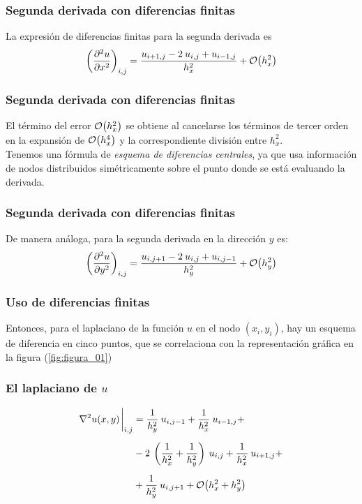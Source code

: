 \begin{frame}
\frametitle{Segunda derivada con diferencias finitas}
La expresión de diferencias finitas para la segunda derivada es
\begin{align}
\left( \pdv[2]{u}{x} \right)_{i,j} = \dfrac{u_{i+1, j} - 2 \: u_{i, j} + u_{i-1,j}}{h_{x}^{2}} + \order{h_{x}^{2}}
\label{eq:ecuacion_13_03}
\end{align}
\end{frame}
\begin{frame}
\frametitle{Segunda derivada con diferencias finitas}
El término del error $\order{h_{x}^{2}}$ se obtiene al cancelarse los términos de tercer orden en la expansión de $\order{h_{x}^{4}}$ y la correspondiente división entre $h_{x}^{2}$.
\\
\bigskip
Tenemos una fórmula de \emph{esquema de diferencias centrales}, ya que usa información de nodos distribuidos simétricamente sobre el punto donde se está evaluando la derivada.
\end{frame}
\begin{frame}
\frametitle{Segunda derivada con diferencias finitas}
De manera análoga, para la segunda derivada en la dirección $y$ es:
\begin{align}
\left( \pdv[2]{u}{y} \right)_{i,j} = \dfrac{u_{i, j+1} - 2 \: u_{i, j} + u_{i, j-1}}{h_{y}^{2}} + \order{h_{y}^{2}}
\label{eq:ecuacion_13_04}
\end{align}
\end{frame}
\begin{frame}
\frametitle{Uso de diferencias finitas}
Entonces, para el laplaciano de la función $u$ en el nodo $(x_{i}, y_{i})$, hay un esquema de diferencia en cinco puntos, que se correlaciona con la representación gráfica en la figura (\ref{fig:figura_01})
\end{frame}
\begin{frame}
\frametitle{El laplaciano de $u$}
\begin{align}
\begin{aligned}
\laplacian{u (x, y)}\eval_{i,j} &= \dfrac{1}{h_{y}^{2}} \: u_{i, j-1} + \dfrac{1}{h_{x}^{2}} \: u_{i-1, j} + \\[0.5em]
&- 2 \: \left( \dfrac{1}{h_{x}^{2}} + \dfrac{1}{h_{y}^{2}} \right) \: u_{i, j}  + \dfrac{1}{h_{x}^{2}} \: u_{i+1, j}  + \\[0.5em]
&+ \dfrac{1}{h_{y}^{2}} \: u_{i, j+1} + \order{h_{x}^{2} + h_{y}^{2}}
\end{aligned}
\label{eq:ecuacion_13_05}
\end{align}
\end{frame}
